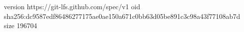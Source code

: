 version https://git-lfs.github.com/spec/v1
oid sha256:dc9587edf86486277175ae0ae150a671c0bb63d05be891c3c98a43f77108ab7d
size 196704
